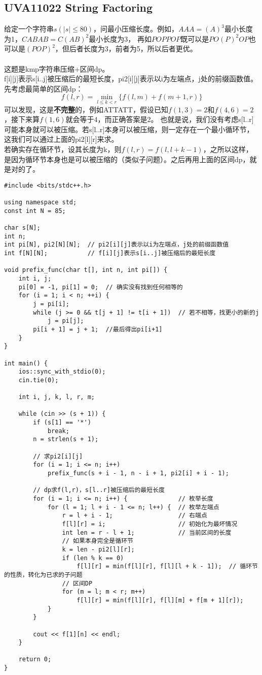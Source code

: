     \subsection{UVA11022 String Factoring}
        给定一个字符串$s(|s| \le 80)$，问最小压缩长度。例如，$AAA=(A)^3$最小长度为1，$CABAB=C(AB)^2$最小长度为3，
        再如$POPPOP$既可以是$PO(P)^2OP$也可以是$(POP)^2$，但后者长度为3，前者为5，所以后者更优。\\\\
        这题是kmp字符串压缩+区间dp。\\
        f[i][j]表示s[i..j]被压缩后的最短长度，pi2[i][j]表示以i为左端点，j处的前缀函数值。先考虑最简单的区间dp：
        $$f(l,r)=\min_{l \le k < r}{\{f(l,m)+f(m+1,r)\}}$$
        可以发现，这是\textbf{不完整}的，例如ATTATT，假设已知$f(1,3)=2$和$f(4,6)=2$，接下来算$f(1,6)$就会等于4，而正确答案是2。
        也就是说，我们没有考虑s[l..r]可能本身就可以被压缩。若s[l..r]本身可以被压缩，则一定存在一个最小循环节，这我们可以通过上面的pi2[l][r]来求。\\
        若确实存在循环节，设其长度为k，则$f(l,r)=f(l,l+k-1)$，之所以这样，是因为循环节本身也是可以被压缩的（类似子问题）。之后再用上面的区间dp，就是对的了。
        \begin{lstlisting}
#include <bits/stdc++.h>

using namespace std;
const int N = 85;

char s[N];
int n;
int pi[N], pi2[N][N];  // pi2[i][j]表示以i为左端点，j处的前缀函数值
int f[N][N];           // f[i][j]表示s[i..j]被压缩后的最短长度

void prefix_func(char t[], int n, int pi[]) {
    int i, j;
    pi[0] = -1, pi[1] = 0;  // 确实没有找到任何相等的
    for (i = 1; i < n; ++i) {
        j = pi[i];
        while (j >= 0 && t[j + 1] != t[i + 1])  // 若不相等，找更小的新的j
            j = pi[j];
        pi[i + 1] = j + 1;  //最后得出pi[i+1]
    }
}

int main() {
    ios::sync_with_stdio(0);
    cin.tie(0);

    int i, j, k, l, r, m;

    while (cin >> (s + 1)) {
        if (s[1] == '*')
            break;
        n = strlen(s + 1);

        // 求pi2[i][j]
        for (i = 1; i <= n; i++)
            prefix_func(s + i - 1, n - i + 1, pi2[i] + i - 1);

        // dp求f(l,r)，s[l..r]被压缩后的最短长度
        for (i = 1; i <= n; i++) {              // 枚举长度
            for (l = 1; l + i - 1 <= n; l++) {  // 枚举左端点
                r = l + i - 1;                  // 右端点
                f[l][r] = i;                    // 初始化为最坏情况
                int len = r - l + 1;            // 当前区间的长度
                // 如果本身完全是循环节
                k = len - pi2[l][r];
                if (len % k == 0)
                    f[l][r] = min(f[l][r], f[l][l + k - 1]);  // 循环节的性质，转化为已求的子问题
                // 区间DP
                for (m = l; m < r; m++)
                    f[l][r] = min(f[l][r], f[l][m] + f[m + 1][r]);
            }
        }

        cout << f[1][n] << endl;
    }

    return 0;
}
        \end{lstlisting}